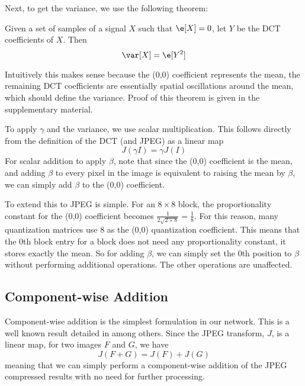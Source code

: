 \documentclass[10pt,twocolumn,letterpaper]{article}
\begin{document}
Next, to get the variance, we use the following theorem:
\begin{theorem}
    Given a set of samples of a signal $X$ such that $\e[X] = 0$, let $Y$ be the DCT coefficients of $X$. Then 
    \begin{equation}
    \var[X] = \e[Y^2]
    \end{equation}
\end{theorem}
Intuitively this makes sense because the (0,0) coefficient represents the mean, the remaining DCT coefficients are essentially spatial oscillations around the mean, which should define the variance. Proof of this theorem is given in the supplementary material.

To apply $\gamma$ and the variance, we use scalar multiplication. This follows directly from the definition of the DCT (and JPEG) as a linear map
\begin{equation}
    J(\gamma I) = \gamma J(I)
\end{equation}
For scalar addition to apply $\beta$, note that since the (0,0) coefficient is the mean, and adding $\beta$ to every pixel in the image is equivalent to raising the mean by $\beta$, we can simply add $\beta$ to the (0,0) coefficient.

To extend this to JPEG is simple. For an $8 \times 8$ block, the proportionality constant for the (0,0) coefficient becomes $\frac{1}{2\sqrt{2 \times 8}} = \frac{1}{8}$. For this reason, many quantization matrices use $8$ as the (0,0) quantization coefficient. This means that the 0th block entry for a block does not need any proportionality constant, it stores exactly the mean. So for adding $\beta$, we can simply set the 0th position to $\beta$ without performing additional operations. The other operations are unaffected. 

\subsection{Component-wise Addition}

Component-wise addition is the simplest formulation in our network. This is a well known result detailed in \cite{chang1992video, shen1998block, shen1995inner, smith1993algorithms} among others. Since the JPEG transform, $J$, is a linear map, for two images $F$ and $G$, we have 
\begin{equation}
J(F + G) = J(F) + J(G)
\end{equation}
meaning that we can simply perform a component-wise addition of the JPEG compressed results with no need for further processing.
\end{document}
